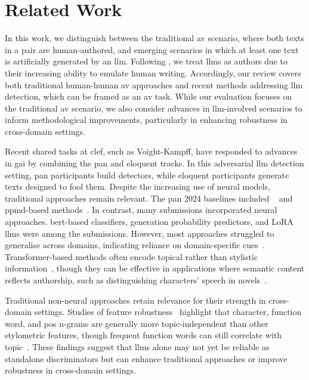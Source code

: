 \chapter{Related Work}
\label{chap:related_work}

In this work, we distinguish between the traditional \ac{av} scenario, where both texts in a pair are human-authored, and emerging scenarios in which at least one text is artificially generated by an \ac{llm}. 
Following \citet{llm_detection_av_2025}, we treat \acp{llm} as authors due to their increasing ability to emulate human writing. 
Accordingly, our review covers both traditional human-human \ac{av} approaches and recent methods addressing \ac{llm} detection, which can be framed as an \ac{av} task. 
While our evaluation focuses on the traditional \ac{av} scenario, we also consider advances in \ac{llm}-involved scenarios to inform methodological improvements, particularly in enhancing robustness in cross-domain settings.

Recent shared tasks at \acs{clef}, such as Voight-Kampff, have responded to advances in \ac{gai} by combining the \acs{pan} and \acs{eloquent} tracks. 
In this adversarial \ac{llm} detection setting, \acs{pan} participants build detectors, while \acs{eloquent} participants generate texts designed to fool them. 
Despite the increasing use of neural models, traditional approaches remain relevant. 
The \acs{pan} 2024 baselines included \unmasking{}~\citep{koppel_authorship_2004,koppel_authorship_2011,bevendorff_generalizing_2019,bevendorff_divergence_based_2020} and \ac{ppmd}-based methods~\citep{tyo_state_2022,neal_surveying_2018}.
In contrast, many submissions incorporated neural approaches. 
\acs{bert}-based classifiers, generation probability predictors, and LoRA \acp{llm} were among the submissions. 
However, most approaches struggled to generalise across domains, indicating reliance on domain-specific cues~\citep{bevendorff_overview_2024,rivera_soto_learning_2021}. 
Transformer-based methods often encode topical rather than stylistic information~\citep{nguyen_bert_topic_av_2023,sawatphol_cross_topic_av_24}, though they can be effective in applications where semantic content reflects authorship, such as distinguishing characters' speech in novels~\citep{michel_fictional_2024}.

Traditional non-neural approaches retain relevance for their strength in cross-domain settings. 
Studies of feature robustness~\citep{stamatatos_survey_2009,barlas_cross_domain_2020} highlight that character, function word, and \ac{pos} n-grams are generally more topic-independent than other stylometric features, though frequent function words can still correlate with topic~\citep{bischoff_importance_2020}. 
These findings suggest that \acp{llm} alone may not yet be reliable as standalone discriminators but can enhance traditional approaches or improve robustness in cross-domain settings.

